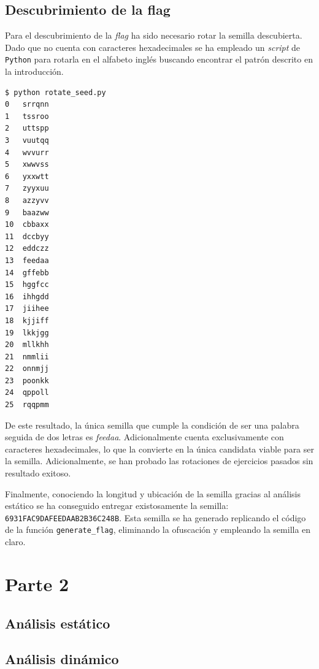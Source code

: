 \documentclass[]{article}
\begin{document}
\subsection{Descubrimiento de la flag}
\label{flag1}

Para el descubrimiento de la \textit{flag} ha sido necesario rotar la semilla
descubierta. Dado que no cuenta con caracteres hexadecimales se ha empleado un
\textit{script} de \texttt{Python} para rotarla en el alfabeto inglés buscando
encontrar el patrón descrito en la introducción.

\begin{lstlisting}[caption=Resultado de rotar la semilla en el alfabeto inglés]
$ python rotate_seed.py 
0	srrqnn
1	tssroo
2	uttspp
3	vuutqq
4	wvvurr
5	xwwvss
6	yxxwtt
7	zyyxuu
8	azzyvv
9	baazww
10	cbbaxx
11	dccbyy
12	eddczz
13	feedaa
14	gffebb
15	hggfcc
16	ihhgdd
17	jiihee
18	kjjiff
19	lkkjgg
20	mllkhh
21	nmmlii
22	onnmjj
23	poonkk
24	qppoll
25	rqqpmm
\end{lstlisting}

De este resultado, la única semilla que cumple la condición de ser una palabra
seguida de dos letras es \textit{feedaa}. Adicionalmente cuenta exclusivamente
con caracteres hexadecimales, lo que la convierte en
la única candidata viable para ser la semilla. Adicionalmente, se han
probado las rotaciones de ejercicios pasados sin resultado exitoso.

Finalmente, conociendo la longitud y ubicación de la semilla gracias al
análisis estático se ha conseguido entregar existosamente la semilla:
\texttt{6931FAC9DAFEEDAAB2B36C248B}. Esta semilla se ha generado replicando el
código de la función \texttt{generate\_flag}, eliminando la ofuscación y
empleando la semilla en claro.

\section{Parte 2}
\label{sec:type2}

\subsection{Análisis estático}
\label{subsec:analisis-estatico-2}

\subsection{Análisis dinámico}
\label{subsec:analisis-dinámico-2}
\end{document}
